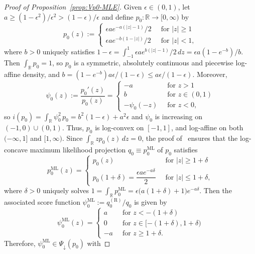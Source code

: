 \documentclass[a4paper]{article}
\newcommand{\R}{\mathbb{R}}
\theoremstyle{definition}
\begin{document}
\begin{proof}[Proof of Proposition~\ref{prop:Vp0-MLE}]
Given $\epsilon \in (0,1)$, let $a \geq (1 - \epsilon^2)/\epsilon^2 > (1 - \epsilon)/\epsilon$ and define $p_0 \colon \R \to [0,\infty)$ by
\[
p_0(z) :=
\begin{cases}
\epsilon a e^{-a(|z| - 1)}/2 \;\;&\text{for }|z| \geq 1 \\
\epsilon a e^{-b(1 - |z|)}/2 \;\;&\text{for }|z| < 1,
\end{cases}
\]
where $b > 0$ uniquely satisfies $1 - \epsilon = \int_{-1}^1 \epsilon a e^{b(|z| - 1)}/2\,dz = \epsilon a(1 - e^{-b})/b$. Then $\int_\R p_0 = 1$, so $p_0$ is a symmetric, absolutely continuous and piecewise log-affine density, and $b = (1 - e^{-b})a\epsilon/(1 - \epsilon) \leq a\epsilon/(1 - \epsilon)$. 
Moreover,
\[
\psi_0(z) := \frac{p_0'(z)}{p_0(z)} =
\begin{cases}
-a \;\;&\text{for }z > 1 \\
b \;\;&\text{for }z \in (0,1) \\
-\psi_0(-z) \;\;&\text{for }z < 0,
\end{cases}
\]
so $i(p_0) = \int_\R \psi_0^2\,p_0 = b^2(1 - \epsilon) + a^2\epsilon$ and $\psi_0$ is increasing on $(-1,0) \cup (0,1)$. Thus, $p_0$ is log-convex on $[-1,1]$, and log-affine on both $(-\infty,1]$ and $[1,\infty)$. Since $\int_\R zp_0(z)\,dz = 0$, the proof of~\citet[Remark~2.11(ii)]{dumbgen2011approximation} ensures that the log-concave maximum likelihood projection $q_0 \equiv p_0^{\mathrm{ML}}$ of $p_0$ satisfies
\[
p_0^{\mathrm{ML}}(z) =
\begin{cases}
p_0(z) \;\;&\text{for }|z| \geq 1 + \delta \\
p_0(1 + \delta) = \dfrac{\epsilon a e^{-a\delta}}{2} \;\;&\text{for }|z| \leq 1 + \delta,
\end{cases} 
\]
where $\delta > 0$ uniquely solves $1 = \int_\R p_0^{\mathrm{ML}} = \epsilon\bigl(a(1 + \delta) + 1\bigr)e^{-a\delta}$. Then the associated score function $\psi_0^{\mathrm{ML}} := q_0^{(\mathrm{R})}/q_0$ is given by
\[
\psi_0^{\mathrm{ML}}(z) = 
\begin{cases}
a \;\;&\text{for }z < -(1 + \delta) \\
0 \;\;&\text{for }z \in [-(1 + \delta), 1 + \delta) \\
-a \;\;&\text{for }z \geq 1 + \delta.
\end{cases}
\]
Therefore, $\psi_0^{\mathrm{ML}} \in \Psi_\downarrow(p_0)$ with

\end{proof}
\end{document}
